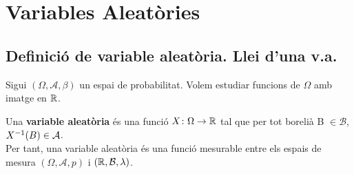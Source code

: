 \section{Variables Aleatòries}
\subsection{Definició de variable aleatòria. Llei d'una v.a.}
Sigui $(\Omega, \mathcal{A}, \beta)$  un espai de probabilitat. Volem estudiar funcions de $\Omega$ amb imatge en $\mathbb{R}$.

\begin{defi}
  Una \textbf{variable aleatòria} és una funció $X\colon \Omega \to \mathbb{R}$ tal que per tot borelià B 
  $\in \mathcal{B}$, $X^{-1}(B) \in \mathcal{A}$. \\
  
  Per tant, una variable aleatòria és una funció mesurable entre els espais de mesura $(\Omega, \mathcal{A}, p)$ i $(\mathbb{R}, \mathcal{B}, \lambda)$.
\end{defi}


